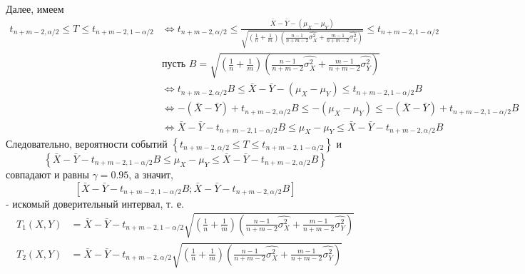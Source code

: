 \documentclass{article}
\begin{document}
Далее, имеем 
\begin{equation*}
    \begin{aligned}
        t_{n+m-2, \alpha / 2} \leq T \leq t_{n+m-2,1-\alpha / 2}&\Longleftrightarrow t_{n+m-2, \alpha / 2} \leq \frac{\bar{X}-\bar{Y}-\left(\mu_{X}-\mu_{Y}\right)}{\sqrt{\left(\frac{1}{n}+\frac{1}{m}\right)\left(\frac{n-1}{n+m-2} \widehat{\sigma_{X}^{2}}+\frac{m-1}{n+m-2} \widehat{\sigma_{Y}^{2}}\right)}} \leq t_{n+m-2,1-\alpha / 2}\\
        &\text{пусть }B=\sqrt{\left(\frac{1}{n}+\frac{1}{m}\right)\left(\frac{n-1}{n+m-2} \widehat{\sigma_{X}^{2}}+\frac{m-1}{n+m-2} \widehat{\sigma_{Y}^{2}}\right)}\\
        &\Longleftrightarrow t_{n+m-2, \alpha / 2} B \leq \bar{X}-\bar{Y}-\left(\mu_{X}-\mu_{Y}\right) \leq t_{n+m-2,1-\alpha / 2} B\\
        &\Longleftrightarrow -(\bar{X}-\bar{Y})+t_{n+m-2, \alpha / 2} B \leq-\left(\mu_{X}-\mu_{Y}\right) \leq-(\bar{X}-\bar{Y})+t_{n+m-2,1-\alpha / 2} B\\
        &\Longleftrightarrow \bar{X}-\bar{Y}-t_{n+m-2,1-\alpha / 2} B \leq \mu_{X}-\mu_{Y} \leq \bar{X}-\bar{Y}-t_{n+m-2, \alpha / 2} B
    \end{aligned}
\end{equation*}
Следовательно, вероятности событий $\left\{t_{n+m-2, \alpha / 2} \leq T \leq t_{n+m-2,1-\alpha / 2}\right\}$ и
\begin{equation*}
    \left\{\bar{X}-\bar{Y}-t_{n+m-2,1-\alpha / 2} B \leq \mu_{X}-\mu_{Y} \leq \bar{X}-\bar{Y}-t_{n+m-2, \alpha / 2} B\right\}
\end{equation*}
совпадают и равны $\gamma=0.95$, а значит,
\begin{equation*}
    \left[\bar{X}-\bar{Y}-t_{n+m-2,1-\alpha / 2} B; \bar{X}-\bar{Y}-t_{n+m-2, \alpha / 2} B\right]
\end{equation*}
- искомый доверительный интервал, т. е.
\begin{equation*}
    \begin{aligned}
        T_{1}(X, Y)&=\bar{X}-\bar{Y}-t_{n+m-2,1-\alpha / 2} \sqrt{\left(\frac{1}{n}+\frac{1}{m}\right)\left(\frac{n-1}{n+m-2} \widehat{\sigma_{X}^{2}}+\frac{m-1}{n+m-2} \widehat{\sigma_{Y}^{2}}\right)}\\
        T_{2}(X, Y)&=\bar{X}-\bar{Y}-t_{n+m-2, \alpha / 2} \sqrt{\left(\frac{1}{n}+\frac{1}{m}\right)\left(\frac{n-1}{n+m-2} \widehat{\sigma_{X}^{2}}+\frac{m-1}{n+m-2} \widehat{\sigma_{Y}^{2}}\right)}
    \end{aligned}
\end{equation*}
\end{document}

